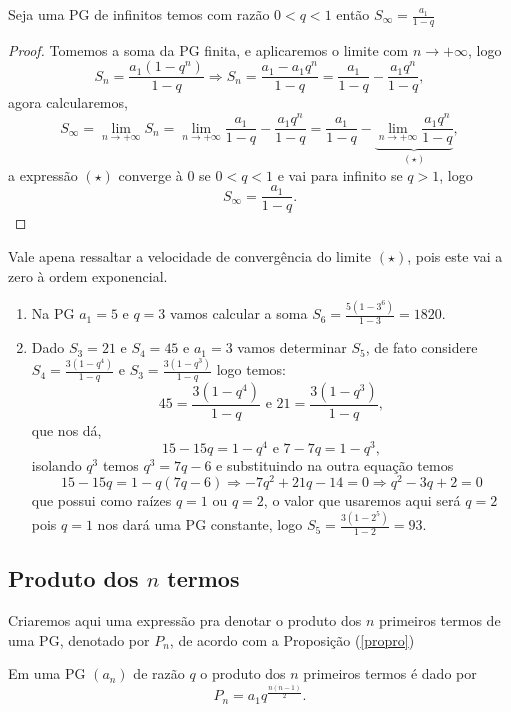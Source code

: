 \begin{teo}
Seja uma PG de infinitos temos com razão $0<q<1$ então $\displaystyle S_{\infty} = \frac{a_1}{1-q}$ 
\end{teo}

\begin{proof}
Tomemos a soma da PG finita, e aplicaremos o limite com $n \rightarrow +\infty$, logo
$$S_n = \frac{a_1(1-q^{n})}{1-q} \Rightarrow S_n = \frac{a_1-a_1q^{n}}{1-q} = \frac{a_1}{1-q} - \frac{a_1q^n}{1-q},$$
agora calcularemos,
$$S_{\infty} = \lim_{n\rightarrow+\infty} S_n = \lim_{n\rightarrow+\infty}\frac{a_1}{1-q} - \frac{a_1q^n}{1-q} = \frac{a_1}{1-q} - \underbrace{\lim_{n\rightarrow+\infty}\frac{a_1q^n}{1-q}}_{(\star)},$$
a expressão $(\star)$ converge à 0 se $0<q<1$ e vai para infinito se $q>1$, logo 
\begin{equation}
    S_{\infty} = \frac{a_1}{1-q}.
\end{equation}
\end{proof}
\inic Vale apena ressaltar a velocidade de convergência do limite $(\star)$, pois este vai a zero à ordem exponencial.\\
\begin{example}
\begin{enumerate}
    \item [(i)] Na PG $a_1 = 5$ e $q = 3$ vamos calcular a soma $S_6= \frac{5(1-3^6)}{1-3} = 1820.$
    \item[(ii)] Dado $S_3 = 21$ e $S_4 = 45$ e $a_1 = 3$ vamos determinar $S_5$, de fato considere $S_4 = \frac{3(1-q^4)}{1-q}$ e $S_3 = \frac{3(1-q^3)}{1-q}$ logo temos:
    $$ 45 = \frac{3(1-q^4)}{1-q}\,\, \text{e}\,\, 21 = \frac{3(1-q^3)}{1-q},$$
    que nos dá, 
    $$ 15 - 15q = 1 - q^4\,\,\text{e}\,\, 7-7q = 1-q^3,$$
    isolando $q^3$ temos $q^3 = 7q-6$ e substituindo na outra equação temos
    $$15 - 15q = 1 - q(7q-6) \Rightarrow -7q^2+21q -14 = 0 \Rightarrow q^2-3q +2 = 0$$
    que possui como raízes $q=1$ ou $q=2$, o valor que usaremos aqui será $q=2$ pois $q=1$ nos dará uma PG constante, logo $S_5 = \frac{3(1-2^5)}{1-2} = 93.$
\end{enumerate}

\end{example}

\subsection{Produto dos $n$ termos}
\inic Criaremos aqui uma expressão pra denotar o produto dos $n$ primeiros termos de uma PG, denotado por $P_n$, de acordo com a Proposição (\ref{propro})
\begin{prop}
\label{propro}
Em uma PG $(a_n)$ de razão $q$ o produto dos $n$ primeiros termos é dado por
\begin{equation}
    P_n = a_1q^{\frac{n(n-1)}{2}}.
\end{equation}
\end{prop}

